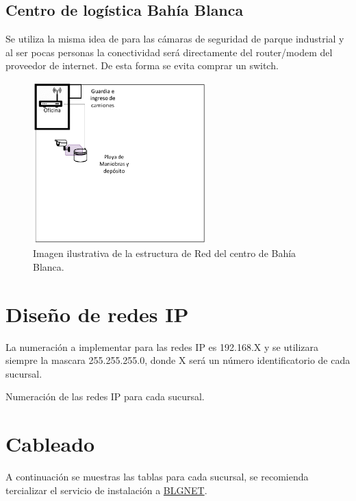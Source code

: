 \documentclass[11pt]{article}
\begin{document}
    \subsection{Centro de logística Bahía Blanca}
    Se utiliza la misma idea de para las cámaras de seguridad de parque industrial y al ser pocas personas la conectividad será directamente del router/modem 
    del proveedor de internet. De esta forma se evita comprar un switch. 
    
    \begin{figure}[H]
        \centering
        \includegraphics[width=0.6\textwidth]{Figure/Central_Bahia.png}
        \caption{Imagen ilustrativa de la estructura de Red del centro de Bahía Blanca.}
    \end{figure}

    \section{Diseño de redes IP}

    La numeración a implementar para las redes IP es 192.168.X y se utilizara siempre la mascara 255.255.255.0, donde X será un número identificatorio de 
    cada sucursal.

    \begin{table}
        \centering
        
        \caption{Numeración de las redes IP para cada sucursal.}
    \end{table}


    \section{Cableado}

    A continuación se muestras las tablas para cada sucursal, se recomienda tercializar el servicio de 
    instalación a \href{https://blgnet.com.ar/home/index.php#contact}{BLGNET}.
\end{document}
